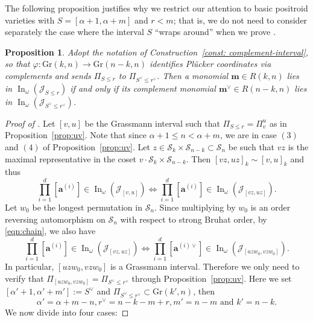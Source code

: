 \documentclass[12pt,reqno]{amsart}
\newtheorem{prop}[lemma]{Proposition}
\theoremstyle{definition}
\newcommand{\inn}{\operatorname{In}}
\renewcommand{\aa}{\mathbf a}
\newcommand{\mm}{\mathbf m}
\newcommand{\cJ}{\mathcal{J}}
\newcommand{\symm}{\mathcal{S}}
\newcommand{\gr}{\mathrm{Gr}}
\begin{document}
{The following proposition justifies why we restrict our attention to basic positroid varieties with $S = [\alpha+1,\alpha+m]$ and $r<m$; that is, we do not need to consider separately the case where the interval $S$ ``wraps around'' when we prove .

\begin{prop}\label{prop:init-dual}
Adopt the notation of Construction~\ref{const: complement-interval}, so that
\(\varphi:\gr(k,n)\to \gr(n-k,n)\) identifies Pl\"ucker coordinates via complements and sends
\(\Pi_{S\le r}\) to \(\Pi_{S^\vee\le r^\vee}\).
Then a monomial \(\mm\in R(k,n)\) lies in \(\inn_\omega(\cJ_{S\le r})\) if and only if its
complement monomial \(\mm^\vee\in R(n-k,n)\) lies in \(\inn_\omega(\cJ_{S^\vee\le r^\vee})\).
\end{prop}

    

\begin{proof}[Proof of ]
    Let $[v,u]$ be the Grassmann interval such that $\Pi_{S\leq r} = \Pi_v^u$ as in Proposition~\ref{prop:uv}. Note that since $\alpha+1\leq n < \alpha+m$, we are in case $(3)$ and $(4)$ of Proposition~\ref{prop:uv}. Let $z\in \symm_k\times \symm_{n-k}\subset \symm_n$ be such that $vz$ is the maximal representative in the coset $v\cdot \symm_k\times \symm_{n-k}$.
    Then $[vz,uz]_k\sim [v,u]_k$ and thus 
    \[\prod_{i = 1}^d [\aa^{(i)}]\in \inn_\omega(\cJ_{[v,u]}) \iff \prod_{i = 1}^d [\aa^{(i)}]\in \inn_\omega(\cJ_{[vz,uz]}).\]
    Let $w_0$ be the longest permutation in $\symm_n$. Since multiplying by $w_0$ is an order reversing automorphism on $\symm_n$ with respect to strong Bruhat order, 
    by \eqref{eqn:chain}, we also have 
    \[\prod_{i = 1}^d [\aa^{(i)}]\in \inn_\omega (\cJ_{[vz,uz]}) \iff \prod_{i = 1}^d [\aa^{(i)\vee}]\in \inn_\omega(\cJ_{[uzw_0,vzw_0]}).\]
    In particular, $[uzw_0,vzw_0]$ is a Grassmann interval.
    Therefore we only need to verify that $\Pi_{[uzw_0,vzw_0]} = \Pi_{S^\vee\leq r^\vee}$ through Proposition~\ref{prop:uv}. 
    Here we set $[\alpha'+1,\alpha'+m'] := S^\vee$ and $\Pi_{S^\vee\leq r^\vee}\subset \gr(k',n)$, then 
    \begin{equation}\label{eqn:S'}
        \alpha' = \alpha+m-n, r^\vee = n-k-m+r, m' = n-m\text{ and }k' = n-k.
    \end{equation}
    We now divide into four cases:


\end{proof}}
\end{document}
